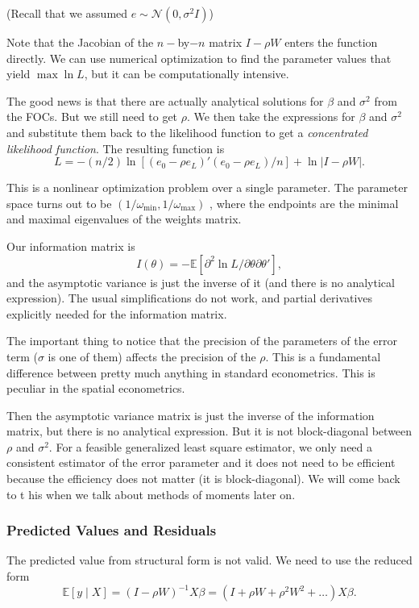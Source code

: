 \documentclass[11pt,a4paper]{amsart}
\theoremstyle{plain}
\theoremstyle{definition}
\begin{document}
(Recall that we assumed $e \sim \mathscr{N}(0, \sigma^{2}I)$) 

Note that the Jacobian of the $n-$by$-n$ matrix $I-\rho W$ enters the function directly. We can use numerical optimization to find the parameter values that yield $\max \ln L$, but it can be computationally intensive.

The good news is that there are actually analytical solutions for $\beta$ and $\sigma^{2}$ from the FOCs. But we still need to get $\rho$. We then take the expressions for  $\beta$ and $\sigma^{2}$ and substitute them back to the likelihood function to get a \textit{concentrated likelihood function}. The resulting function is 
\[	L = -(n/2) \ln [(e_{0}-\rho e_{L})'(e_{0}-\rho e_{L})/n] + \ln |I-\rho W|.	\]

This is a nonlinear optimization problem over a single parameter. The parameter space turns out to be $(1/\omega_{\min}, 1/\omega_{\max})$ , where the endpoints are the minimal and maximal eigenvalues of the weights matrix. 

Our information matrix is 
\[	I(\theta) = - \mathbb{E}[\partial^{2} \ln  L/\partial \theta \partial \theta'],	\]
and the asymptotic variance is just the inverse of it (and there is no analytical expression). The usual simplifications do not work, and partial derivatives explicitly needed for the information matrix. 

The important thing to notice that the precision of the parameters of the error term ($\sigma$ is one of them) affects the precision of the $\rho$. This is a fundamental difference between pretty much anything in standard econometrics. This is peculiar in the spatial econometrics. 

Then the asymptotic variance matrix is just the inverse of the information matrix, but there is no analytical expression. But it is not block-diagonal between $\rho$ and $\sigma^{2}$. For a feasible generalized least square estimator, we only need a consistent estimator of the error parameter and it does not need to be efficient because the efficiency does not matter (it is block-diagonal). We will come back to t his when we talk about methods of moments later on. 

\subsubsection{Predicted Values and Residuals}\hfill\par 
The predicted value from structural form is not valid. We need to use the reduced form 
\[	\mathbb{E}[y \mid X] = (I - \rho W)^{-1}X \beta = (I + \rho W + \rho^{2}W^{2} + \dots) X \beta.	\]
\end{document}
